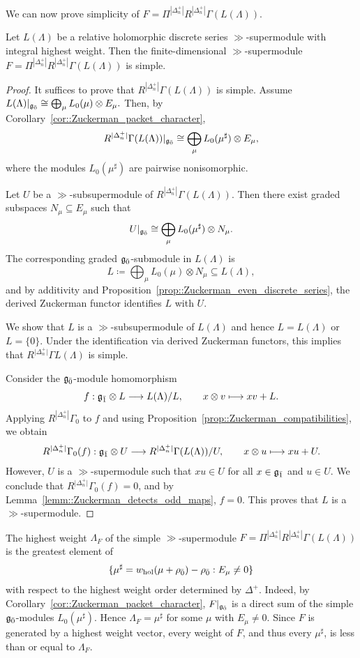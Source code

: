 We can now prove simplicity of $F=\Pi^{|\Delta_n^+|}R^{|\Delta_n^+|}\Gamma(L(\Lambda))$.

\begin{proposition}
\label{prop::Zuckerman_image_simple}
Let $L(\Lambda)$ be a relative holomorphic discrete series $\gg$-supermodule with integral highest weight. Then the finite-dimensional $\gg$-supermodule
$
F=\Pi^{|\Delta_n^+|}R^{|\Delta_n^+|}\Gamma(L(\Lambda))
$
is simple.
\end{proposition}

\begin{proof}
It suffices to prove that $R^{|\Delta_n^+|}\Gamma(L(\Lambda))$ is simple. Assume 
$
L(\Lambda)|_{{\mathfrak{g}_{\bar{0}}}}
\cong
\bigoplus_\mu L_0(\mu)\otimes E_\mu.
$
Then, by Corollary~\ref{cor::Zuckerman_packet_character},
\[
R^{|\Delta_n^+|}\Gamma(L(\Lambda))|_{{\mathfrak{g}_{\bar{0}}}}
\cong
\bigoplus_\mu L_0(\mu^\sharp)\otimes E_\mu,
\]
where the modules $L_0(\mu^\sharp)$ are pairwise nonisomorphic.

Let $U$ be a $\gg$-subsupermodule of $R^{|\Delta_n^+|}\Gamma(L(\Lambda))$. Then there exist graded subspaces $N_\mu\subseteq E_\mu$ such that
\[
U|_{{\mathfrak{g}_{\bar{0}}}}
\cong
\bigoplus_\mu L_0(\mu^\sharp)\otimes N_\mu.
\]
The corresponding graded ${\mathfrak{g}_{\bar{0}}}$-submodule in $L(\Lambda)$ is
\[
L \coloneqq
\bigoplus_\mu L_0(\mu)\otimes N_\mu
\subseteq L(\Lambda),
\]
and by additivity and Proposition~\ref{prop::Zuckerman_even_discrete_series}, the derived Zuckerman functor identifies $L$ with $U$.

We show that $L$ is a $\gg$-subsupermodule of $L(\Lambda)$ and hence $L=L(\Lambda)$ or $L=\{0\}$. Under the identification via derived Zuckerman functors, this implies that $R^{\vert \Delta_{n}^{+}\vert}\Gamma L(\Lambda)$ is simple. 

 Consider the ${\mathfrak{g}_{\bar{0}}}$-module homomorphism
\[
f:{\mathfrak{g}_{\bar{1}}}\otimes L\longrightarrow L(\Lambda)/L,
\qquad x\otimes v\longmapsto xv+L.
\]
Applying $R^{|\Delta_n^+|}\Gamma_0$ to $f$ and using Proposition~\ref{prop::Zuckerman_compatibilities}, we obtain
\[
R^{|\Delta_n^+|}\Gamma_0(f):
{\mathfrak{g}_{\bar{1}}}\otimes U\longrightarrow R^{|\Delta_n^+|}\Gamma(L(\Lambda))/U, \qquad x\otimes u\longmapsto xu+U.
\]
However, $U$ is a $\gg$-supermodule such that $xu\in U$ for all $x\in {\mathfrak{g}_{\bar{1}}}$ and $u\in U$. We conclude that $R^{\vert \Delta_{n}^{+}\vert}\Gamma_{0}(f)=0$, and by Lemma~\ref{lemm::Zuckerman_detects_odd_maps}, $f=0$. This proves that $L$ is a $\gg$-supermodule.
\end{proof}

\begin{remark}
The highest weight $\Lambda_F$ of the simple $\gg$-supermodule
$F=\Pi^{|\Delta_n^+|}R^{|\Delta_n^+|}\Gamma(L(\Lambda))$
is the greatest element of
\[
\{
\mu^\sharp = w_{\operatorname{hol}}(\mu+\rho_{\bar0})-\rho_{\bar0}:E_\mu\neq0
\}
\]
with respect to the highest weight order determined by $\Delta^+$. Indeed, by Corollary~\ref{cor::Zuckerman_packet_character}, $F|_{{\mathfrak{g}_{\bar{0}}}}$ is a direct sum of the simple ${\mathfrak{g}_{\bar{0}}}$-modules $L_0(\mu^\sharp)$. Hence $\Lambda_F=\mu^\sharp$ for some $\mu$ with $E_\mu\neq0$. Since $F$ is generated by a highest weight vector, every weight of $F$, and thus every $\mu^\sharp$, is less than or equal to $\Lambda_F$.
\end{remark}



